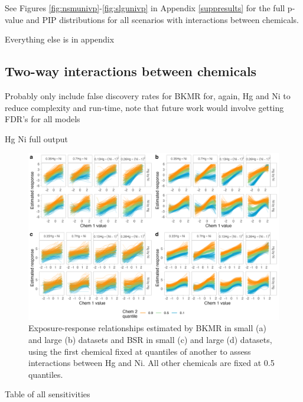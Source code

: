 \documentclass[12pt, twoside]{amherstthesis}
\begin{document}
See Figures \ref{fig:nsmunivp}-\ref{fig:slgunivp} in Appendix \ref{suppresults} for the full p-value and PIP distributions for all scenarios with interactions between chemicals.

Everything else is in appendix

\hypertarget{two-way-interactions-between-chemicals}{%
\subsection{Two-way interactions between chemicals}\label{two-way-interactions-between-chemicals}}

Probably only include false discovery rates for BKMR for, again, Hg and Ni to reduce complexity and run-time, note that future work would involve getting FDR's for all models

Hg Ni full output
\begin{figure}

{\centering \includegraphics[width=1\linewidth]{figures/ch4_hgni_biv} 

}

\caption{Exposure-response relationships estimated by BKMR in small (a) and large (b) datasets and BSR in small (c) and large (d) datasets, using the first chemical fixed at quantiles of another to assess interactions between Hg and Ni. All other chemicals are fixed at 0.5 quantiles.}\label{fig:hgnibiv}
\end{figure}
Table of all sensitivities
\end{document}
